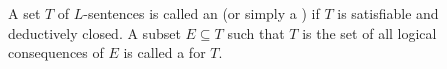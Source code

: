 A set $T$ of $L$-sentences is called an  (or simply a ) if $T$ is satisfiable and deductively closed. A subset $E \subseteq T$ such that $T$ is the set of all logical consequences of $E$ is called a  for $T$.
